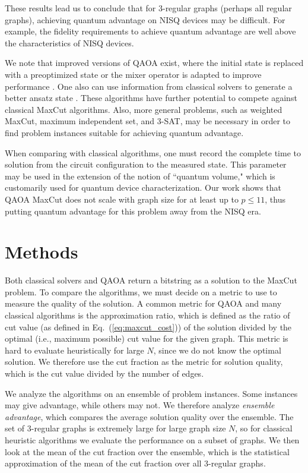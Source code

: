 \documentclass[prb,reprint,nofootinbib,longbibliography,superscriptaddress]{revtex4-1}
\begin{document}
These results lead us to  conclude that for 3-regular graphs (perhaps all regular graphs),  achieving quantum advantage on NISQ devices may be difficult. For example, the fidelity requirements to achieve quantum advantage are well above the characteristics of NISQ devices.



We note that  improved versions of QAOA exist, where the initial state is replaced with a preoptimized state \cite{warmstartQAOA} or the mixer operator is adapted to improve performance \cite{zhu2020adaptive, Govia2021}. One also can use information from classical solvers to generate a better ansatz state \cite{wurtz2021classically}. These algorithms have further potential to compete against classical MaxCut algorithms.
Also, more general problems, such as weighted MaxCut, maximum independent set, and 3-SAT, may be necessary in order to find problem instances suitable for achieving quantum advantage.

When comparing with classical algorithms, one must record the complete time to solution from the  circuit configuration to the measured state. This parameter may be used in the extension of the notion of ``quantum volume," which is customarily used for quantum device characterization.
Our work shows that QAOA MaxCut does not scale with graph size for at least up to $p\leq11$, thus putting quantum advantage for this problem away from the NISQ era.



\section{Methods}\label{sec:methodology}

Both classical solvers and QAOA return a bitstring as a solution to the MaxCut problem. To compare the algorithms,
we must decide on a metric to use to measure the quality of the solution. A common metric for QAOA and many classical algorithms is the approximation ratio, which is defined as the ratio of cut value (as defined in Eq.~(\ref{eq:maxcut_cost})) of the solution divided by the optimal (i.e., maximum possible) cut value for the given graph.
This metric is hard to evaluate heuristically for large $N$, since we do not know the optimal solution. We therefore use the cut fraction as the metric for solution quality, which is the cut value divided by the number of edges.

We analyze the algorithms on an ensemble of problem instances. Some instances may give advantage, while others may not. We 
therefore analyze \emph{ensemble advantage},
which compares the average solution quality over the ensemble.
The set of 3-regular graphs is extremely large for large graph size $N$, so for classical heuristic algorithms we evaluate the performance on a subset of graphs.
We then look at the mean of the cut fraction over the ensemble, which is the statistical approximation of the mean of the cut fraction over all 3-regular graphs.
\end{document}
